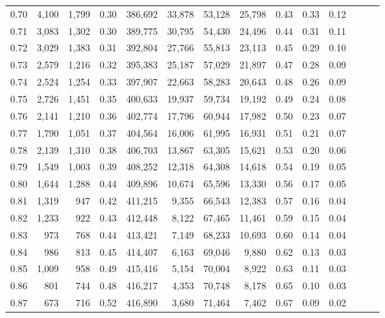 \begin{tabular}{rrrrrrrrrrrrrr}
0.70 &   4,100 &  1,799 &  0.30 &  386,692 &   33,878 &  53,128 &  25,798 &  0.43 &  0.33 &      0.12 \\
0.71 &   3,083 &  1,302 &  0.30 &  389,775 &   30,795 &  54,430 &  24,496 &  0.44 &  0.31 &      0.11 \\
0.72 &   3,029 &  1,383 &  0.31 &  392,804 &   27,766 &  55,813 &  23,113 &  0.45 &  0.29 &      0.10 \\
0.73 &   2,579 &  1,216 &  0.32 &  395,383 &   25,187 &  57,029 &  21,897 &  0.47 &  0.28 &      0.09 \\
0.74 &   2,524 &  1,254 &  0.33 &  397,907 &   22,663 &  58,283 &  20,643 &  0.48 &  0.26 &      0.09 \\
0.75 &   2,726 &  1,451 &  0.35 &  400,633 &   19,937 &  59,734 &  19,192 &  0.49 &  0.24 &      0.08 \\
0.76 &   2,141 &  1,210 &  0.36 &  402,774 &   17,796 &  60,944 &  17,982 &  0.50 &  0.23 &      0.07 \\
0.77 &   1,790 &  1,051 &  0.37 &  404,564 &   16,006 &  61,995 &  16,931 &  0.51 &  0.21 &      0.07 \\
0.78 &   2,139 &  1,310 &  0.38 &  406,703 &   13,867 &  63,305 &  15,621 &  0.53 &  0.20 &      0.06 \\
0.79 &   1,549 &  1,003 &  0.39 &  408,252 &   12,318 &  64,308 &  14,618 &  0.54 &  0.19 &      0.05 \\
0.80 &   1,644 &  1,288 &  0.44 &  409,896 &   10,674 &  65,596 &  13,330 &  0.56 &  0.17 &      0.05 \\
0.81 &   1,319 &    947 &  0.42 &  411,215 &    9,355 &  66,543 &  12,383 &  0.57 &  0.16 &      0.04 \\
0.82 &   1,233 &    922 &  0.43 &  412,448 &    8,122 &  67,465 &  11,461 &  0.59 &  0.15 &      0.04 \\
0.83 &     973 &    768 &  0.44 &  413,421 &    7,149 &  68,233 &  10,693 &  0.60 &  0.14 &      0.04 \\
0.84 &     986 &    813 &  0.45 &  414,407 &    6,163 &  69,046 &   9,880 &  0.62 &  0.13 &      0.03 \\
0.85 &   1,009 &    958 &  0.49 &  415,416 &    5,154 &  70,004 &   8,922 &  0.63 &  0.11 &      0.03 \\
0.86 &     801 &    744 &  0.48 &  416,217 &    4,353 &  70,748 &   8,178 &  0.65 &  0.10 &      0.03 \\
0.87 &     673 &    716 &  0.52 &  416,890 &    3,680 &  71,464 &   7,462 &  0.67 &  0.09 &      0.02 \\

\end{tabular}
